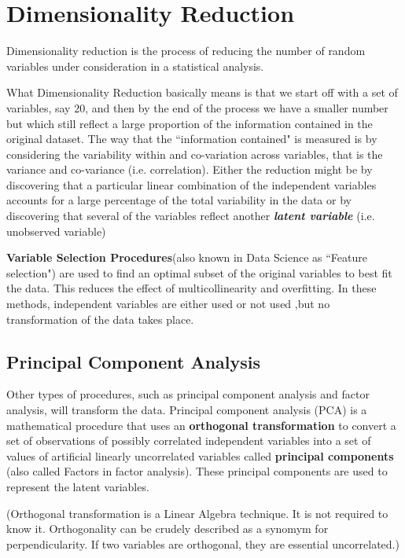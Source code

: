 \section{Dimensionality Reduction}

Dimensionality reduction is the process of reducing the number of random variables under consideration in a statistical analysis.

What Dimensionality Reduction basically means is that we start off with a set of variables, say 20, and then by the end of the process we have a smaller number but which still reflect a large proportion of the information contained in
the original dataset. The way that the ``information contained" is measured is by considering the variability within
and co-variation across variables, that is the variance and co-variance (i.e. correlation). Either the reduction might
be by discovering that a particular linear combination of the independent variables accounts for a large percentage of the total variability in the data or by discovering that several of the variables reflect another \textbf{\textit{latent variable}} (i.e. unobserved variable)


\textbf{Variable Selection Procedures}(also known in Data Science as ``Feature selection") are used to find an optimal subset of the original variables to best fit the data. This reduces the effect of multicollinearity and overfitting. In these methods, independent variables are either used or not used ,but no transformation of the data takes place.


\subsection{Principal Component Analysis}
Other types of procedures, such as principal component analysis and factor analysis, will transform the data.
Principal component analysis (PCA) is a mathematical procedure that uses an \textbf{orthogonal transformation} to convert a set of observations of possibly correlated independent variables into a set of values of artificial linearly uncorrelated variables called \textbf{principal components} (also called Factors in factor analysis). These principal components are used to represent the latent variables.

(Orthogonal transformation is a Linear Algebra technique. It is not required to know it. Orthogonality can be crudely described as a synomym for perpendicularity. If two variables are orthogonal, they are essential uncorrelated.)

